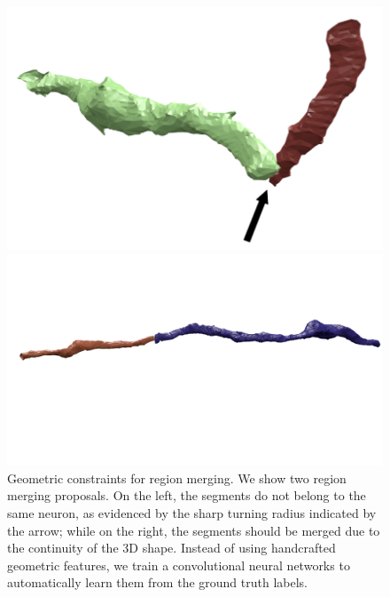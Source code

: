 \begin{figure}[t]
	\begin{minipage}{0.4\linewidth}
		\includegraphics[width=\linewidth]{./figures/constraint_error.png}
	\end{minipage}
	\hfill
	\begin{minipage}{0.55\linewidth}
		\includegraphics[width=\linewidth]{./figures/constraint_success.png}
	\end{minipage}
	\caption{Geometric constraints for region merging. We show two region merging proposals. On the left, the segments do not belong to the same neuron, as evidenced by the sharp turning radius indicated by the arrow; while on the right, the segments should be merged due to the continuity of the 3D shape. Instead of using handcrafted geometric features, we train a convolutional neural networks to automatically learn them from the ground truth labels.}
	\label{fig:turn-radii}
\end{figure}
